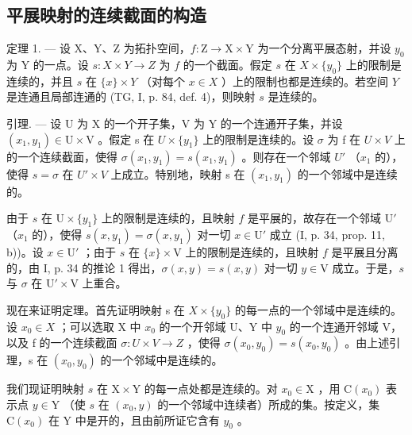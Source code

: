 \subsection{平展映射的连续截面的构造}

定理 1. --- 设 X、Y、Z 为拓扑空间，\(f: \mathrm{Z} \to \mathrm{X} \times \mathrm{Y}\) 为一个分离平展态射，并设 \(y_0\) 为 Y 的一点。设 \(s: X \times Y \to Z\) 为 \(f\) 的一个截面。假定 \(s\) 在 \(X \times \{y_0\}\) 上的限制是连续的，并且 \(s\) 在 \(\{x\} \times Y\) （对每个 \(x \in X\) ）上的限制也都是连续的。若空间 \(Y\) 是连通且局部连通的 (TG, I, p. 84, def. 4)，则映射 \(s\) 是连续的。

引理. --- 设 U 为 X 的一个开子集，V 为 Y 的一个连通开子集，并设 \((x_{1},y_{1})\in\mathrm{U}\times\mathrm{V}\) 。假定 s 在 \(U\times\{y_{1}\}\) 上的限制是连续的。设 \(\sigma\) 为 f 在 \(U\times V\) 上的一个连续截面，使得 \(\sigma(x_{1},y_{1})=s(x_{1},y_{1})\) 。则存在一个邻域 \(U'\) （\(x_{1}\) 的），使得 \(s=\sigma\) 在 \(U'\times V\) 上成立。特别地，映射 s 在 \((x_{1},y_{1})\) 的一个邻域中是连续的。

由于 \(s\) 在 \(\mathrm{U} \times \{y_1\}\) 上的限制是连续的，且映射 \(f\) 是平展的，故存在一个邻域 \(\mathrm{U}'\) （\(x_1\) 的），使得 \(s(x, y_1) = \sigma(x, y_1)\) 对一切 \(x \in \mathrm{U}'\) 成立 (I, p. 34, prop. 11, b))。设 \(x \in \mathrm{U}'\) ；由于 \(s\) 在 \(\{x\} \times \mathrm{V}\) 上的限制是连续的，且映射 \(f\) 是平展且分离的，由 I, p. 34 的推论 1 得出，\(\sigma(x, y) = s(x, y)\) 对一切 \(y \in \mathrm{V}\) 成立。于是，\(s\) 与 \(\sigma\) 在 \(\mathrm{U}' \times \mathrm{V}\) 上重合。

现在来证明定理。首先证明映射 s 在 \(X \times \{y_{0}\}\) 的每一点的一个邻域中是连续的。设 \(x_{0} \in X\) ；可以选取 X 中 \(x_{0}\) 的一个开邻域 U、Y 中 \(y_{0}\) 的一个连通开邻域 V，以及 f 的一个连续截面 \(\sigma: U \times V \to Z\) ，使得 \(\sigma(x_{0}, y_{0}) = s(x_{0}, y_{0})\) 。由上述引理，s 在 \((x_{0}, y_{0})\) 的一个邻域中是连续的。

我们现证明映射 \(s\) 在 \(\mathrm{X} \times \mathrm{Y}\) 的每一点处都是连续的。对 \(x_0 \in \mathrm{X}\) ，用 \(\mathrm{C}(x_0)\) 表示点 \(y \in \mathrm{Y}\) （使 \(s\) 在 \((x_0, y)\) 的一个邻域中连续者）所成的集。按定义，集 \(\mathrm{C}(x_0)\) 在 Y 中是开的，且由前所证它含有 \(y_0\) 。

